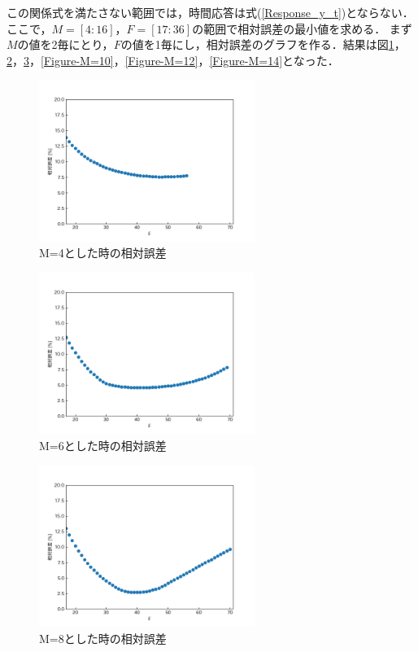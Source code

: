\documentclass[12pt]{jsarticle}
\begin{document}
この関係式を満たさない範囲では，時間応答は式(\ref{Response_y_t})とならない．
ここで，$M=[4:16]$，$F=[17:36]$の範囲で相対誤差の最小値を求める．
まず$M$の値を2毎にとり，$F$の値を1毎にし，相対誤差のグラフを作る．結果は図\ref{Figure-M=4}，\ref{Figure-M=6}，\ref{Figure-M=8}，\ref{Figure-M=10}，\ref{Figure-M=12}，\ref{Figure-M=14}となった．
\begin{figure}[tb]
  \begin{center}
    \includegraphics[clip,width=7.0cm]{../img/M-4.png}
    \caption{M=4とした時の相対誤差}
    \label{Figure-M=4}
  \end{center}
\end{figure}
\begin{figure}[tb]
  \begin{center}
    \includegraphics[clip,width=7.0cm]{../img/M-6.png}
    \caption{M=6とした時の相対誤差}
    \label{Figure-M=6}
  \end{center}
\end{figure}
\begin{figure}[tb]
  \begin{center}
    \includegraphics[clip,width=7.0cm]{../img/M-8.png}
    \caption{M=8とした時の相対誤差}
    \label{Figure-M=8}
  \end{center}
\end{figure}
\end{document}
